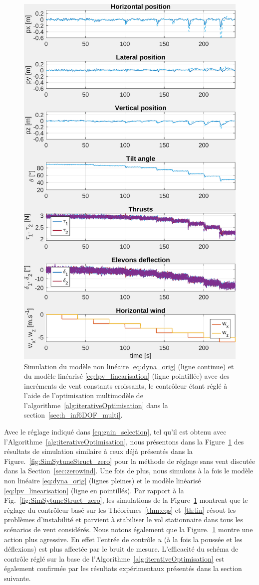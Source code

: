\begin{figure}[ht!]
    \centering
    \includegraphics[trim=0cm 0cm 0cm 0cm,clip,width=0.6\columnwidth]{figures/sim_systune_lpv_noise.png}
    \caption{Simulation du modèle non linéaire \eqref{eq:dyna_orig} (ligne continue) et du modèle linéarisé \eqref{eq:lpv_linearisation} (ligne pointillée) avec des incréments de vent constants croissants, le contrôleur étant réglé à l'aide de l'optimisation multimodèle de l'algorithme~\ref{alg:iterativeOptimisation} dans la section~\ref{sec:h_inf6DOF_multi}.}
    \label{fig:SimSytuneStruct_lpv}
\end{figure}

Avec le réglage indiqué dans \eqref{eq:gain_selection}, tel qu'il est obtenu avec l'Algorithme~\ref{alg:iterativeOptimisation}, nous présentons dans la Figure~\ref{fig:SimSytuneStruct_lpv} des résultats de simulation similaire à ceux déjà présentés dans la Figure.~\ref{fig:SimSytuneStruct_zero} pour la méthode de réglage sans vent discutée dans la Section~\ref{sec:zerowind}. Une fois de plus, nous simulons à la fois le modèle non linéaire \eqref{eq:dyna_orig} (lignes pleines) et le modèle linéarisé \eqref{eq:lpv_linearisation} (ligne en pointillés). 
Par rapport à la Fig.~\ref{fig:SimSytuneStruct_zero}, les simulations de la Figure~\ref{fig:SimSytuneStruct_lpv} montrent que le réglage du contrôleur basé sur les Théorèmes~\ref{thm:eqs} et~\ref{th:lin} résout les problèmes d'instabilité et parvient à stabiliser le vol stationnaire dans tous les scénarios de vent considérés. Nous notons également que la Figure.~\ref{fig:SimSytuneStruct_lpv} montre une action plus agressive. En effet l'entrée de contrôle $u$ (à la fois la poussée et les déflexions) est plus affectée par le bruit de mesure.
L'efficacité du schéma de contrôle réglé sur la base de l'Algorithme~\ref{alg:iterativeOptimisation} est également confirmée par les résultats expérimentaux présentés dans la section suivante.



